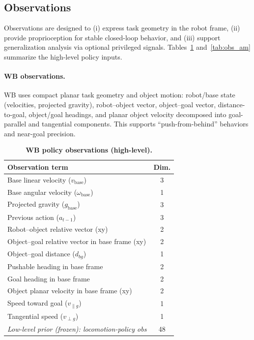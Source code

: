 \subsection{Observations}
\label{sec:obs}
Observations are designed to (i) express task geometry in the robot frame, (ii) provide proprioception for stable closed-loop behavior,
and (iii) support generalization analysis via optional privileged signals. Tables~\ref{tab:obs_wb} and~\ref{tab:obs_am} summarize the high-level policy inputs.

\paragraph{WB observations.}
WB uses compact planar task geometry and object motion:
robot/base state (velocities, projected gravity), robot--object vector, object--goal vector, distance-to-goal, object/goal headings,
and planar object velocity decomposed into goal-parallel and tangential components.
This supports ``push-from-behind'' behaviors and near-goal precision.


\begin{table}[h]
\centering
\caption{\textbf{WB policy observations (high-level).}}
\label{tab:obs_wb}
\footnotesize
\setlength{\tabcolsep}{3pt}
\renewcommand{\arraystretch}{1.08}
\begin{tabular}{l c}
\toprule
\textbf{Observation term} & \textbf{Dim.}\\
\midrule
Base linear velocity ($v_{\text{base}}$) & 3\\
Base angular velocity ($\omega_{\text{base}}$) & 1\\
Projected gravity ($g_{\text{base}}$) & 3\\
Previous action ($a_{t-1}$) & 3\\
\addlinespace[0.25em]\hline\addlinespace[0.15em]
Robot--object relative vector (xy) & 2\\
Object--goal relative vector in base frame (xy) & 2\\
Object--goal distance ($d_{bg}$) & 1\\
Pushable heading in base frame & 2\\
Goal heading in base frame & 2\\
\addlinespace[0.25em]\hline\addlinespace[0.15em]
Object planar velocity in base frame (xy) & 2\\
Speed toward goal ($v_{\parallel g}$) & 1\\
Tangential speed ($v_{\perp g}$) & 1\\
\addlinespace[0.25em]\hline\addlinespace[0.15em]
\textit{Low-level prior (frozen): locomotion-policy obs} & 48\\
\bottomrule
\end{tabular}
\end{table}


